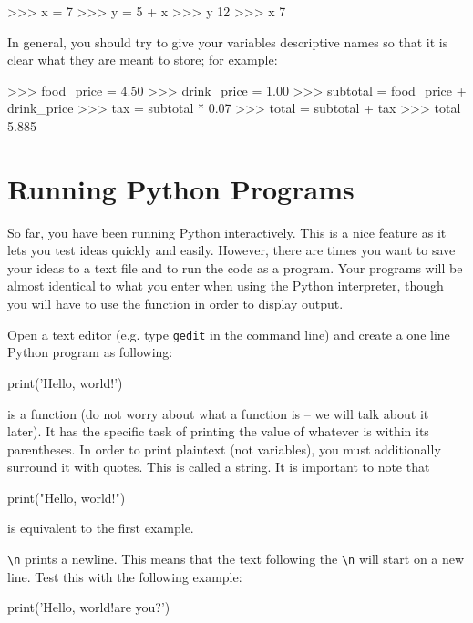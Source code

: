 \documentclass[11pt]{cselabheader}
\begin{document}
\begin{pyconcode}
>>> x = 7
>>> y = 5 + x
>>> y
12
>>> x
7
\end{pyconcode}

In general, you should try to give your variables descriptive names so that it is
clear what they are meant to store; for example:

\begin{pyconcode}
>>> food_price = 4.50
>>> drink_price = 1.00
>>> subtotal = food_price + drink_price
>>> tax = subtotal * 0.07
>>> total = subtotal + tax
>>> total
5.885
\end{pyconcode}

\pagebreak
\section{Running Python Programs}

So far, you have been running Python interactively. This is a nice feature as it
lets you test ideas quickly and easily. However, there are times you want to
save your ideas to a text file and to run the code as a program. Your programs
will be almost identical to what you enter when using the Python interpreter,
though you will have to use the  function in order to display
output.

Open a text editor (e.g. type \texttt{gedit} in the command line) and create a
one line Python program as following:

\begin{python3code}
print('Hello, world!')
\end{python3code}

 is a function (do not worry about what a function is -- we
will talk about it later).
It has the specific task of printing the value of whatever is within its
parentheses. In order to print plaintext (not variables), you must additionally
surround it with quotes. This is called a string. It is important to note that

\begin{python3code}
print("Hello, world!")
\end{python3code}

is equivalent to the first example.

\texttt{\textbackslash n} prints a newline. This means that the text following
the \texttt{\textbackslash n} will start on a new line. Test this with the
following example:

\begin{python3code}
print('Hello, world!\nHow are you?')
\end{python3code}
\end{document}

